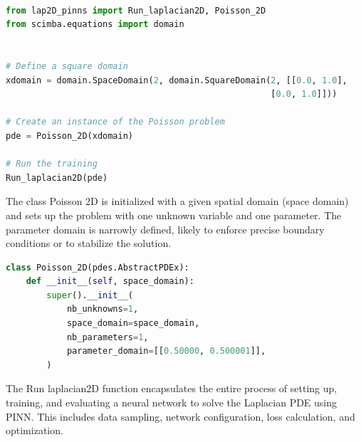 \documentclass[12pt]{article}
\begin{document}
\begin{lstlisting}[language=Python,caption={},frame=single, backgroundcolor=\color{gray!10}, basicstyle=\footnotesize,rulecolor=\color{blue}, framexleftmargin=3pt, commentstyle=\color{mygreen}, keywordstyle=\color{blue}]

from lap2D_pinns import Run_laplacian2D, Poisson_2D
from scimba.equations import domain


# Define a square domain
xdomain = domain.SpaceDomain(2, domain.SquareDomain(2, [[0.0, 1.0], 
                                                    [0.0, 1.0]]))

# Create an instance of the Poisson problem
pde = Poisson_2D(xdomain)

# Run the training
Run_laplacian2D(pde)

\end{lstlisting}

The class Poisson 2D is initialized with a given spatial domain (space domain) and sets up the problem with one unknown variable and one parameter.
The parameter domain is narrowly defined, likely to enforce precise boundary conditions or to stabilize the solution.
\begin{lstlisting}[language=Python,caption={},frame=single, backgroundcolor=\color{gray!10}, basicstyle=\footnotesize,rulecolor=\color{blue}, framexleftmargin=3pt, commentstyle=\color{mygreen}, keywordstyle=\color{blue}]
class Poisson_2D(pdes.AbstractPDEx):
    def __init__(self, space_domain):
        super().__init__(
            nb_unknowns=1,
            space_domain=space_domain,
            nb_parameters=1,
            parameter_domain=[[0.50000, 0.500001]],
        )

\end{lstlisting}


The Run laplacian2D function encapsulates the entire process of setting up, training, and evaluating a neural network to solve the Laplacian PDE using PINN. This includes data sampling, network configuration, loss calculation, and optimization.
\end{document}
